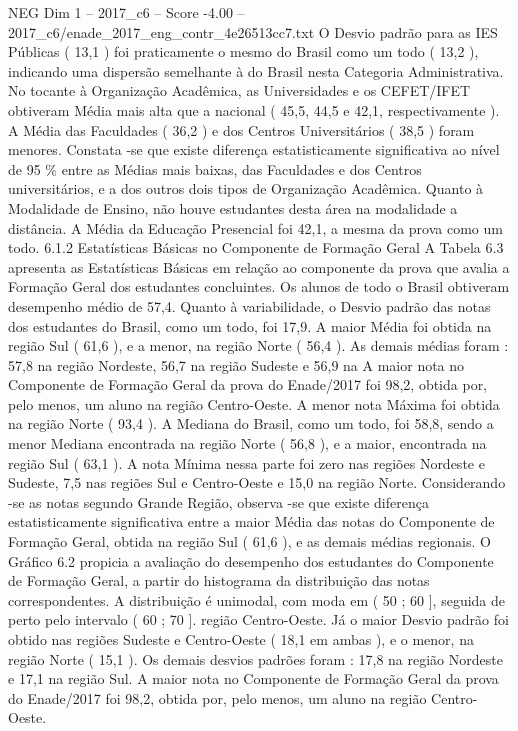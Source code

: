 \begin{textsample}{NEG Dim 1 – 2017\_c6 – Score -4.00 – 2017\_c6/enade\_2017\_eng\_contr\_4e26513cc7.txt}
O Desvio padrão para as IES Públicas ( 13,1 ) foi praticamente o mesmo do Brasil como um todo ( 13,2 ), indicando uma dispersão semelhante à do Brasil nesta Categoria Administrativa.
No tocante à Organização Acadêmica, as Universidades e os CEFET/IFET obtiveram Média mais alta que a nacional ( 45,5, 44,5 e 42,1, respectivamente ).
A Média das Faculdades ( 36,2 ) e dos Centros Universitários ( 38,5 ) foram menores.
Constata -se que existe diferença estatisticamente significativa ao nível de 95 \% entre as Médias mais baixas, das Faculdades e dos Centros universitários, e a dos outros dois tipos de Organização Acadêmica.
Quanto à Modalidade de Ensino, não houve estudantes desta área na modalidade a distância.
A Média da Educação Presencial foi 42,1, a mesma da prova como um todo. 6.1.2 Estatísticas Básicas no Componente de Formação Geral A Tabela 6.3 apresenta as Estatísticas Básicas em relação ao componente da prova que avalia a Formação Geral dos estudantes concluintes.
Os alunos de todo o Brasil obtiveram desempenho médio de 57,4.
Quanto à variabilidade, o Desvio padrão das notas dos estudantes do Brasil, como um todo, foi 17,9.
A maior Média foi obtida na região Sul ( 61,6 ), e a menor, na região Norte ( 56,4 ).
As demais médias foram : 57,8 na região Nordeste, 56,7 na região Sudeste e 56,9 na A maior nota no Componente de Formação Geral da prova do Enade/2017 foi 98,2, obtida por, pelo menos, um aluno na região Centro-Oeste.
A menor nota Máxima foi obtida na região Norte ( 93,4 ).
A Mediana do Brasil, como um todo, foi 58,8, sendo a menor Mediana encontrada na região Norte ( 56,8 ), e a maior, encontrada na região Sul ( 63,1 ).
A nota Mínima nessa parte foi zero nas regiões Nordeste e Sudeste, 7,5 nas regiões Sul e Centro-Oeste e 15,0 na região Norte.
Considerando -se as notas segundo Grande Região, observa -se que existe diferença estatisticamente significativa entre a maior Média das notas do Componente de Formação Geral, obtida na região Sul ( 61,6 ), e as demais médias regionais.
O Gráfico 6.2 propicia a avaliação do desempenho dos estudantes do Componente de Formação Geral, a partir do histograma da distribuição das notas correspondentes.
A distribuição é unimodal, com moda em ( 50 ; 60 ], seguida de perto pelo intervalo ( 60 ; 70 ]. região Centro-Oeste.
Já o maior Desvio padrão foi obtido nas regiões Sudeste e Centro-Oeste ( 18,1 em ambas ), e o menor, na região Norte ( 15,1 ).
Os demais desvios padrões foram : 17,8 na região Nordeste e 17,1 na região Sul.
A maior nota no Componente de Formação Geral da prova do Enade/2017 foi 98,2, obtida por, pelo menos, um aluno na região Centro-Oeste.

\end{textsample}
